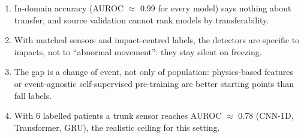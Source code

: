 \begin{enumerate}
  \item In-domain accuracy (AUROC $\approx$ 0.99 for every model) says nothing about transfer, and
        source validation cannot rank models by transferability.
  \item With matched sensors and impact-centred labels, the detectors are specific to impacts, not to
        ``abnormal movement'': they stay silent on freezing.
  \item The gap is a change of event, not only of population: physics-based features or
        event-agnostic self-supervised pre-training are better starting points than fall labels.
  \item With 6 labelled patients a trunk sensor reaches AUROC $\approx$ 0.78 (CNN-1D, Transformer,
        GRU), the realistic ceiling for this setting.
\end{enumerate}
